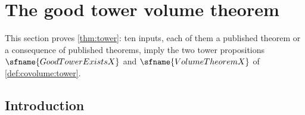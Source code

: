 \section{The good tower volume theorem}\label{sec:pf:tower}

\providecommand{\towerG}{\mathbf G}
\providecommand{\towerII}{\mathrm{II}}
\providecommand{\towerHT}{\mathrm{HT}}
\providecommand{\towerdR}{\mathrm{dR}}
\providecommand{\towerInt}{\mathrm{Int}}
\providecommand{\towerev}{\mathcal F}
\providecommand{\towerTw}{\mathrm{Tw}}
\providecommand{\towerNb}{\mathbf N}

This section proves \cref{thm:tower}: ten inputs, each of them a published theorem or a consequence of
published theorems, imply the two tower propositions $\sfname{GoodTowerExistsX}$ and $\sfname{VolumeTheoremX}$
of \cref{def:covolume:tower}.

\subsection{Introduction}\label{pf:tower:sec-intro}


